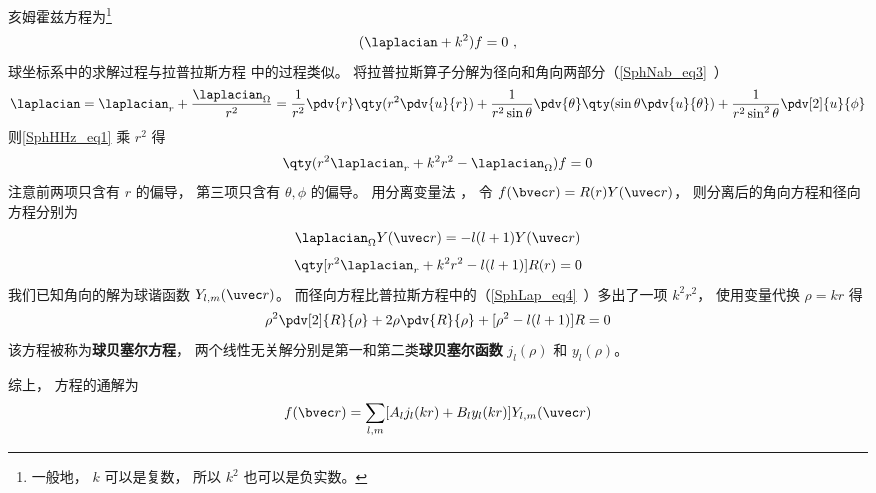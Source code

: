 

亥姆霍兹方程为\footnote{一般地， $k$ 可以是复数， 所以 $k^2$ 也可以是负实数。}
\begin{equation}\label{SphHHz_eq1}
(\laplacian + k^2)f = 0~,
\end{equation}
球坐标系中的求解过程与拉普拉斯方程 中的过程类似。 将拉普拉斯算子分解为径向和角向两部分（\autoref{SphNab_eq3}~）
\begin{equation}
\laplacian = \laplacian_r + \frac{\laplacian_{\Omega}}{r^2} = \frac{1}{r^2} \pdv{r} \qty(r^2 \pdv{u}{r}) + \frac{1}{r^2\sin\theta}\pdv{\theta} \qty(\sin \theta \pdv{u}{\theta}) + \frac{1}{r^2\sin^2 \theta} \pdv[2]{u}{\phi}
\end{equation}
则\autoref{SphHHz_eq1} 乘 $r^2$ 得
\begin{equation}
\qty(r^2\laplacian_r + k^2 r^2 - \laplacian_\Omega) f = 0
\end{equation}
注意前两项只含有 $r$ 的偏导， 第三项只含有 $\theta,\phi$ 的偏导。 用分离变量法 %
， 令 $f(\bvec r) = R(r) Y(\uvec r)$， 则分离后的角向方程和径向方程分别为
\begin{equation}
\laplacian_{\Omega} Y(\uvec r) = -l(l+1) Y(\uvec r)
\end{equation}
\begin{equation}
\qty[r^2\laplacian_r + k^2 r^2 - l(l+1)] R(r) = 0
\end{equation}
我们已知角向的解为球谐函数 $Y_{l,m}(\uvec r)$。 而径向方程比普拉斯方程中的（\autoref{SphLap_eq4}~）多出了一项 $k^2r^2$， 使用变量代换 $\rho = kr$ 得
\begin{equation}
\rho^2\pdv[2]{R}{\rho} + 2\rho\pdv{R}{\rho} + [\rho^2 - l(l+1)] R = 0
\end{equation}
该方程被称为\textbf{球贝塞尔方程}， 两个线性无关解分别是第一和第二类\textbf{球贝塞尔函数} $j_l(\rho)$ 和 $y_l(\rho)$。

综上， 方程的通解为
\begin{equation}
f(\bvec r) = \sum_{l,m} [A_l j_l(kr) + B_l y_l(kr)] Y_{l,m}(\uvec r)
\end{equation}
